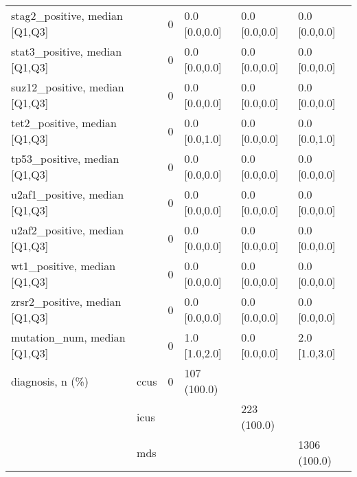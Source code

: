 \begin{tabular}{llllll}
stag2\_positive, median [Q1,Q3] &     &                    0 &       0.0 [0.0,0.0] &       0.0 [0.0,0.0] &     0.0 [0.0,0.0] \\
stat3\_positive, median [Q1,Q3] &     &                    0 &       0.0 [0.0,0.0] &       0.0 [0.0,0.0] &     0.0 [0.0,0.0] \\
suz12\_positive, median [Q1,Q3] &     &                    0 &       0.0 [0.0,0.0] &       0.0 [0.0,0.0] &     0.0 [0.0,0.0] \\
tet2\_positive, median [Q1,Q3] &     &                    0 &       0.0 [0.0,1.0] &       0.0 [0.0,0.0] &     0.0 [0.0,1.0] \\
tp53\_positive, median [Q1,Q3] &     &                    0 &       0.0 [0.0,0.0] &       0.0 [0.0,0.0] &     0.0 [0.0,0.0] \\
u2af1\_positive, median [Q1,Q3] &     &                    0 &       0.0 [0.0,0.0] &       0.0 [0.0,0.0] &     0.0 [0.0,0.0] \\
u2af2\_positive, median [Q1,Q3] &     &                    0 &       0.0 [0.0,0.0] &       0.0 [0.0,0.0] &     0.0 [0.0,0.0] \\
wt1\_positive, median [Q1,Q3] &     &                    0 &       0.0 [0.0,0.0] &       0.0 [0.0,0.0] &     0.0 [0.0,0.0] \\
zrsr2\_positive, median [Q1,Q3] &     &                    0 &       0.0 [0.0,0.0] &       0.0 [0.0,0.0] &     0.0 [0.0,0.0] \\
mutation\_num, median [Q1,Q3] &     &                    0 &       1.0 [1.0,2.0] &       0.0 [0.0,0.0] &     2.0 [1.0,3.0] \\
diagnosis, n (\%) & ccus &                    0 &         107 (100.0) &                     &                   \\
                 & icus &                      &                     &         223 (100.0) &                   \\
                 & mds &                      &                     &                     &      1306 (100.0) \\
\bottomrule
\end{tabular}
